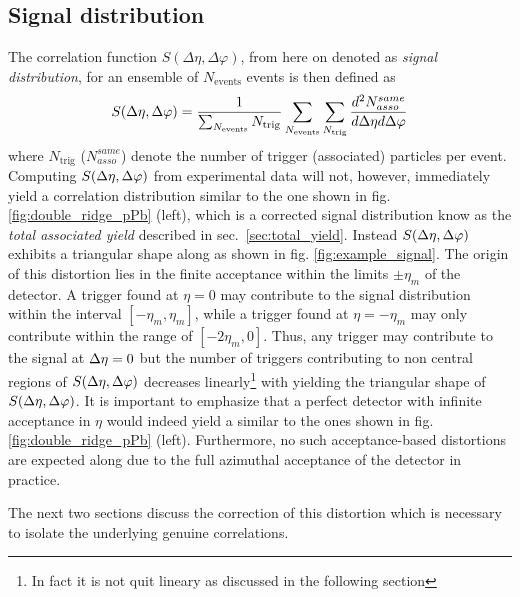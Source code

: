 \subsection{Signal distribution}
\label{sec:signal_distribution}
The correlation function $S(\Delta\eta, \Delta\varphi)$, from here on denoted as \emph{signal distribution}, for an ensemble of $N_{\text{events}}$ events is then defined as
\begin{equation}
  \label{eq:signal}
  S(\Delta\eta, \Delta\varphi) = \frac{1}{\sum_{N_{\text{events}}} N_{\text{trig}}}
  \sum_{N_{\text{events}}} 
  \sum_{N_{\text{trig}}}
  \frac{d^2N_{asso}^{same}}{d\Delta\eta d\Delta\varphi}
\end{equation}
where $N_\text{trig}$ ($N_{asso}^{same}$) denote the number of trigger (associated) particles per event. Computing $S(\Delta\eta, \Delta\varphi)$ from experimental data will not, however, immediately yield a correlation distribution similar to the one shown in fig. \ref{fig:double_ridge_pPb} (left), which is a corrected signal distribution know as the \emph{total associated yield} described in sec.~\ref{sec:total_yield}. Instead $S(\Delta\eta, \Delta\varphi)$ exhibits a triangular shape along \deta as shown in fig. \ref{fig:example_signal}. The origin of this distortion lies in the finite acceptance within the limits $\pm\eta_m$ of the detector. A trigger found at $\eta = 0$ may contribute to the signal distribution within the \deta interval $\left[-\eta_m, \eta_m\right]$, while a trigger found at $\eta = -\eta_m$ may only contribute within the range of $\left[-2\eta_m, 0\right]$. Thus, any trigger may contribute to the signal at $\Delta\eta = 0$ but the number of triggers contributing to non central regions of $S(\Delta\eta, \Delta\varphi)$ decreases linearly\footnote{In fact it is not quit lineary as discussed in the following section} with \deta yielding the triangular shape of $S(\Delta\eta, \Delta\varphi)$. It is important to emphasize that a perfect detector with infinite acceptance in $\eta$  would indeed yield a \Sig similar to the ones shown in fig. \ref{fig:double_ridge_pPb} (left). Furthermore,  no such acceptance-based distortions are expected along \dphi due to the full azimuthal acceptance of the detector in practice.

The next two sections discuss the correction of this distortion  which is necessary to isolate the underlying genuine correlations.


